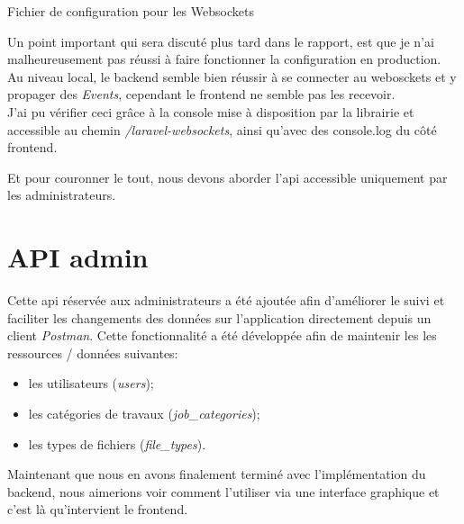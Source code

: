 \documentclass[
    iai, %
    il, %
]{heig-tb}
\begin{document}
\begin{listing}[H]
    \inputminted{php}{assets/code/websockets.php}
    \caption{Fichier de configuration pour les Websockets \label{ws-websockets}}
\end{listing}

Un point important qui sera discuté plus tard dans le rapport, est que je n'ai malheureusement pas réussi à faire fonctionner la configuration en production. \\
Au niveau local, le  \Gls{backend} semble bien réussir à se connecter au webosckets et y propager des \emph{Events}, cependant le \Gls{frontend} ne semble pas les recevoir. \\
J'ai pu vérifier ceci grâce à la console mise à disposition par la librairie et accessible au chemin \emph{/laravel-websockets}, ainsi qu'avec des console.log du côté \Gls{frontend}.

Et pour couronner le tout, nous devons aborder l'\Gls{api} accessible uniquement par les administrateurs.

\section{API admin}
Cette \Gls{api} réservée aux administrateurs a été ajoutée afin d'améliorer le suivi et faciliter les changements des données sur l'application directement depuis un client \emph{Postman}.
Cette fonctionnalité a été développée afin de maintenir les les ressources / données suivantes:
\begin{itemize}
    \item les utilisateurs (\emph{users});
    \item les catégories de travaux (\emph{job\_categories});
    \item les types de fichiers (\emph{file\_types}).
\end{itemize}

Maintenant que nous en avons finalement terminé avec l'implémentation du \Gls{backend}, nous aimerions voir comment l'utiliser via une interface graphique et c'est là qu'intervient le \Gls{frontend}.
\end{document}
